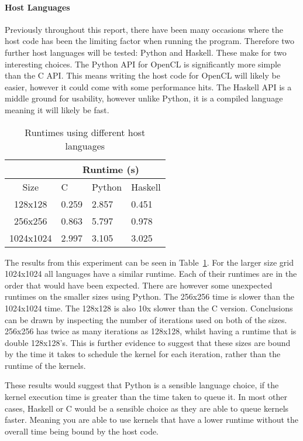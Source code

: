 

\paragraph{Host Languages}

Previously throughout this report, there have been many occasions where the host code has been the limiting factor when running the program. Therefore two further host languages will be tested: Python and Haskell. These make for two interesting choices. The Python API for OpenCL is significantly more simple than the C API. This means writing the host code for OpenCL will likely be easier, however it could come with some performance hits. The Haskell API is a middle ground for usability, however unlike Python, it is a compiled language meaning it will likely be fast. 

\begin{table}[ht]
\vspace{-5mm}
\centering
\caption{Runtimes using different host languages}
\vspace{1mm}
\begin{tabular}{|c||p{3.5em}|p{3.5em}|p{4em}|}
    \hline
    & \multicolumn{3}{|c|}{Runtime (s)}\\
    \hline
    Size & C & Python & Haskell \\
    \hline
    128x128 & 0.259 & 2.857 & 0.451 \\
    \hline
    256x256 & 0.863 & 5.797 & 0.978 \\
    \hline
    1024x1024 & 2.997 & 3.105 & 3.025 \\
    \hline
\end{tabular}
\label{table:host-languages}
\vspace{-3mm}
\end{table}


The results from this experiment can be seen in Table~\ref{table:host-languages}. For the larger size grid 1024x1024 all languages have a similar runtime. Each of their runtimes are in the order that would have been expected. There are however some unexpected runtimes on the smaller sizes using Python. The 256x256 time is slower than the 1024x1024 time. The 128x128 is also 10x slower than the C version. Conclusions can be drawn by inspecting the number of iterations used on both of the sizes. 256x256 has twice as many iterations as 128x128, whilst having a runtime that is double 128x128's. This is further evidence to suggest that these sizes are bound by the time it takes to schedule the kernel for each iteration, rather than the runtime of the kernels. 

These results would suggest that Python is a sensible language choice, if the kernel execution time is greater than the time taken to queue it. In most other cases, Haskell or C would be a sensible choice as they are able to queue kernels faster. Meaning you are able to use kernels that have a lower runtime without the overall time being bound by the host code. 